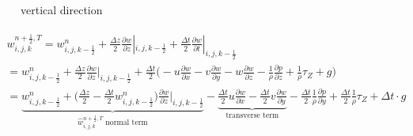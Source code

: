 \documentclass{article}
\numberwithin{equation}{subsection}
\begin{document}
\begin{figure}[!htb]
\centering
{}
\caption{vertical direction}
\end{figure}


\begin{align}
\begin{split}
& w_{i,j,k}^{n+\frac{1}{2},T} = w_{i,j,k-\frac{1}{2}}^n + \frac{\Delta z}{2}\frac{\partial w}{\partial z}|_{i,j,k-\frac{1}{2}} + \frac{\Delta t}{2}\frac{\partial w}{\partial t}|_{i,j,k-\frac{1}{2}}\\
&= w_{i,j,k-\frac{1}{2}}^n + \frac{\Delta z}{2} \frac{\partial w}{\partial z}|_{i,j,k-\frac{1}{2}} + \frac{\Delta t}{2} \Big( -u\frac{\partial w}{\partial x} -v\frac{\partial w}{\partial y} -w\frac{\partial w}{\partial z} - \frac{1}{\rho}\frac{\partial p}{\partial z} + \frac{1}{\rho}\tau_Z + g\Big) \\
&= \underbrace{w_{i,j,k-\frac{1}{2}}^n + \Big(\frac{\Delta z}{2} - \frac{\Delta t}{2} w_{i,j,k-\frac{1}{2}}^n\Big)\frac{\partial w}{\partial z}|_{i,j,k-\frac{1}{2}}}_\text{$\widehat{w}_{i,j,k}^{n+\frac{1}{2},T}$ normal term} -\underbrace{\frac{\Delta t}{2}u\frac{\partial w}{\partial x} - \frac{\Delta t}{2}v\frac{\partial w}{\partial y}}_\text{transverse term} - \frac{\Delta t}{2}\frac{1}{\rho}\frac{\partial p}{\partial y} + \frac{\Delta t}{2}\frac{1}{\rho}\tau_Z + \Delta t \cdot g \\
\end{split}
\end{align}
\end{document}
